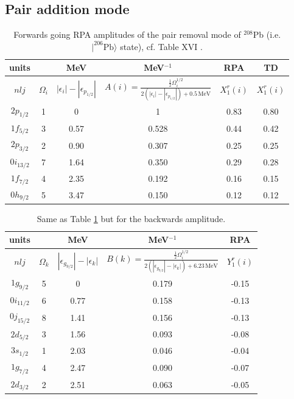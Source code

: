 \subsection{Pair addition mode}
\begin{table}
\begin{tabular}{|c|c|c|c|c|c|}
\hline units &  &MeV  &MeV$^{-1}$  & RPA & TD \\ 
\hline  $nlj$&$\Omega_i$  &$|\epsilon_i|-|\epsilon_{p_{1/2}}|$  &$A(i)=\frac{\frac{1}{2}\Omega_i^{1/2}}{2(|\epsilon_i|-|\epsilon_{p_{1/2}}|)+0.5\,\text{MeV}}$  & $X_1^r(i)$ & $X_1^r(i)$ \\ 
\hline  $2p_{1/2}$& 1 &  0& 1 &  0.83&  0.80\\ 
\hline $1f_{5/2}$ & 3 &  0.57&0.528  & 0.44 & 0.42 \\ 
\hline  $2p_{3/2}$& 2 &  0.90&  0.307&  0.25&  0.25\\ 
\hline  $0i_{13/2}$& 7 & 1.64 & 0.350 & 0.29 &  0.28\\ 
\hline  $1f_{7/2}$&  4& 2.35 &  0.192& 0.16 &  0.15\\ 
\hline  $0h_{9/2}$&  5& 3.47 & 0.150 &  0.12&0.12  \\ 
\hline 
\end{tabular}\caption{Forwards going RPA amplitudes of the pair removal mode of $^{208}$Pb (i.e. $|^{206}\text{Pb}\rangle$ state), cf. Table XVI \cite{Broglia:73}.}\label{tab1E2}
\end{table}
\begin{table}
\begin{tabular}{|c|c|c|c|c|}
\hline units &  &MeV  &MeV$^{-1}$  &  RPA  \\ 
\hline  $nlj$&$\Omega_k$  &$|\epsilon_{g_{9/2}}|-|\epsilon_k|$  &$B(k)=\frac{\frac{1}{2}\Omega_i^{1/2}}{2(|\epsilon_{g_{9/2}}|-|\epsilon_k|)+6.23\,\text{MeV}}$  & $Y_1^r(i)$  \\ 
\hline  $1g_{9/2}$& 5 &  0& 0.179 &  -0.15\\ 
\hline $0i_{11/2}$ & 6 &  0.77&0.158  & -0.13  \\ 
\hline  $0j_{15/2}$& 8 &  1.41&  0.156&  -0.13\\ 
\hline  $2d_{5/2}$& 3 & 1.56 & 0.093 & -0.08 \\ 
\hline  $3s_{1/2}$&  1& 2.03 &  0.046& -0.04\\ 
\hline  $1g_{7/2}$&  4& 2.47 & 0.090 &  -0.07  \\ 
\hline  $2d_{3/2}$&  2& 2.51 & 0.063 &  -0.05 \\ 
\hline 
\end{tabular}\caption{Same as Table \ref{tab1E2} but for the backwards amplitude.}\label{tab1E3}
\end{table}
